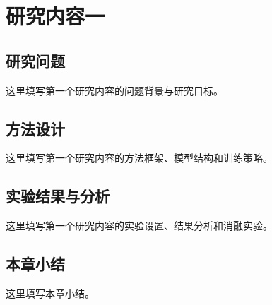 \chapter{研究内容一}

\section{研究问题}

这里填写第一个研究内容的问题背景与研究目标。

\section{方法设计}

这里填写第一个研究内容的方法框架、模型结构和训练策略。

\section{实验结果与分析}

这里填写第一个研究内容的实验设置、结果分析和消融实验。

\section{本章小结}

这里填写本章小结。
